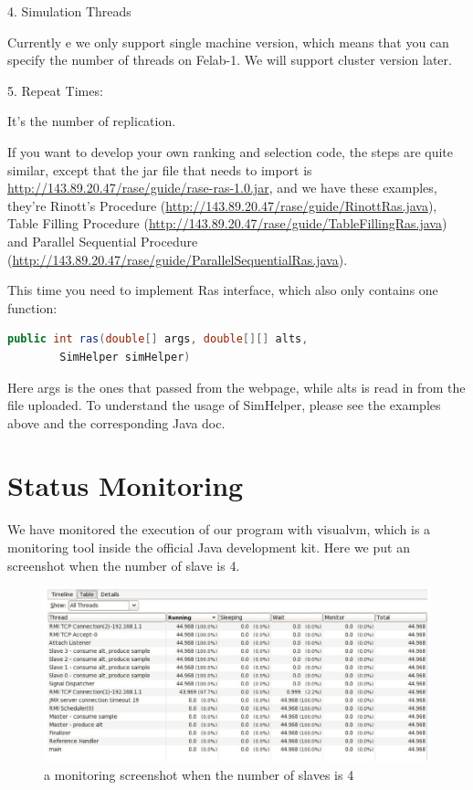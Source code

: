 \documentclass[12pt,a4paper]{report}
\begin{document}
4.	Simulation Threads

Currently e we only support single machine version, which means that you can specify the number of threads on Felab-1. We will support cluster version later.

5.	Repeat Times:

It’s the number of replication.

If you want to develop your own ranking and selection code, the steps are quite similar, except that the jar file that needs to import is \url{http://143.89.20.47/rase/guide/rase-ras-1.0.jar}, and we have these examples, they’re Rinott’s Procedure (\url{http://143.89.20.47/rase/guide/RinottRas.java}), Table Filling Procedure (\url{http://143.89.20.47/rase/guide/TableFillingRas.java}) and Parallel Sequential Procedure (\url{http://143.89.20.47/rase/guide/ParallelSequentialRas.java}).

This time you need to implement Ras interface, which also only contains one function:

\begin{lstlisting}[language=Java]
public int ras(double[] args, double[][] alts,
        SimHelper simHelper)
\end{lstlisting}

Here args is the ones that passed from the webpage, while alts is read in from the file uploaded. To understand the usage of SimHelper, please see the examples above and the corresponding Java doc.

\chapter{Status Monitoring}

We have monitored the execution of our program with visualvm, which is a monitoring tool inside the official Java development kit. Here we put an screenshot when the number of slave is 4.

\begin{figure}[ht]
\centering
\includegraphics[width=128mm]{monitor.png}
\caption{a monitoring screenshot when the number of slaves is 4}
\end{figure}
\end{document}
